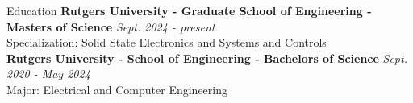 \documentclass{resume}
\begin{document}

    \vspace{-2mm}
    \begin{rSection}{Education}
        {\bf  Rutgers University - Graduate School of Engineering - Masters of Science} \hfill {\em Sept. 2024 - present} \\
        Specialization: Solid State Electronics and Systems and Controls \\
        {\bf Rutgers University - School of Engineering - Bachelors of Science} \hfill {\em Sept. 2020 - May 2024} \\
        Major: Electrical and Computer Engineering \\

    \end{rSection}
    \vspace{-2mm}

\end{document}
